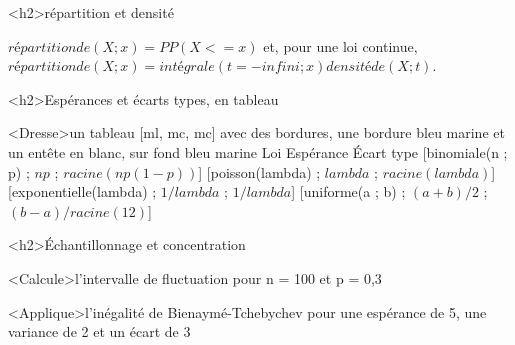 \documentclass[marges=20, taille=11, precision=3]{texecole}
\begin{document}
<h2>répartition et densité

$répartition de(X; x) = PP(X <= x)$ et, pour une loi continue,
$répartition de(X; x) = intégrale(t=-infini;x) densité de(X; t)$.

<h2>Espérances et écarts types, en tableau

<Dresse>un tableau [ml, mc, mc] avec des bordures, une bordure bleu marine et un entête en blanc, sur fond bleu marine {
	Loi	Espérance	Écart type
	[binomiale(n ; p) ; $n p$ ; $racine(n p (1-p))$]
	[poisson(lambda) ; $lambda$ ; $racine(lambda)$]
	[exponentielle(lambda) ; $1/lambda$ ; $1/lambda$]
	[uniforme(a ; b) ; $(a+b)/2$ ; $(b-a)/racine(12)$]
}

<h2>Échantillonnage et concentration

<Calcule>l'intervalle de fluctuation pour n = 100 et p = 0,3

<Applique>l'inégalité de Bienaymé-Tchebychev pour une espérance de 5, une variance de 2 et un écart de 3
\end{document}
